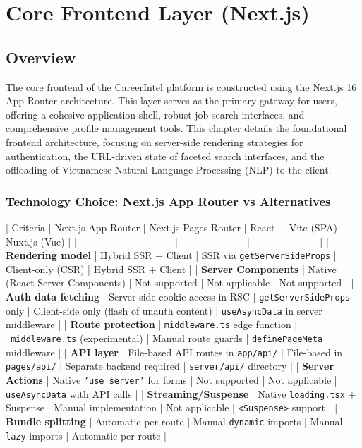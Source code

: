 \chapter{Core Frontend Layer (Next.js)}

\section{Overview}
The core frontend of the CareerIntel platform is constructed using the Next.js 16 App Router architecture. This layer serves as the primary gateway for users, offering a cohesive application shell, robust job search interfaces, and comprehensive profile management tools. This chapter details the foundational frontend architecture, focusing on server-side rendering strategies for authentication, the URL-driven state of faceted search interfaces, and the offloading of Vietnamese Natural Language Processing (NLP) to the client.

\subsection{Technology Choice: Next.js App Router vs Alternatives}

| Criteria | Next.js App Router | Next.js Pages Router | React + Vite (SPA) | Nuxt.js (Vue) |
|----------|-------------------|---------------------|--------------------|-|
| \textbf{Rendering model} | Hybrid SSR + Client | SSR via \texttt{getServerSideProps} | Client-only (CSR) | Hybrid SSR + Client |
| \textbf{Server Components} | Native (React Server Components) | Not supported | Not applicable | Not supported |
| \textbf{Auth data fetching} | Server-side cookie access in RSC | \texttt{getServerSideProps} only | Client-side only (flash of unauth content) | \texttt{useAsyncData} in server middleware |
| \textbf{Route protection} | \texttt{middleware.ts} edge function | \texttt{\_middleware.ts} (experimental) | Manual route guards | \texttt{definePageMeta} middleware |
| \textbf{API layer} | File-based API routes in \texttt{app/api/} | File-based in \texttt{pages/api/} | Separate backend required | \texttt{server/api/} directory |
| \textbf{Server Actions} | Native \texttt{'use server'} for forms | Not supported | Not applicable | \texttt{useAsyncData} with API calls |
| \textbf{Streaming/Suspense} | Native \texttt{loading.tsx} + Suspense | Manual implementation | Not applicable | \texttt{<Suspense>} support |
| \textbf{Bundle splitting} | Automatic per-route | Manual \texttt{dynamic} imports | Manual \texttt{lazy} imports | Automatic per-route |

